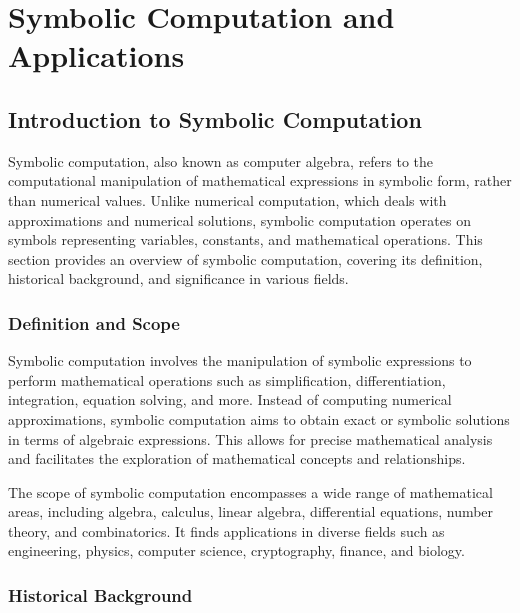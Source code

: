 
\chapter{Symbolic Computation and Applications}
\label{chap2:symbolic_computation}


\section{Introduction to Symbolic Computation}
\label{chap2:sec:introduction}

Symbolic computation, also known as computer algebra, refers to the computational manipulation of mathematical expressions in symbolic form, rather than numerical values. Unlike numerical computation, which deals with approximations and numerical solutions, symbolic computation operates on symbols representing variables, constants, and mathematical operations. This section provides an overview of symbolic computation, covering its definition, historical background, and significance in various fields.

\subsection{Definition and Scope}

Symbolic computation involves the manipulation of symbolic expressions to perform mathematical operations such as simplification, differentiation, integration, equation solving, and more. Instead of computing numerical approximations, symbolic computation aims to obtain exact or symbolic solutions in terms of algebraic expressions. This allows for precise mathematical analysis and facilitates the exploration of mathematical concepts and relationships.

The scope of symbolic computation encompasses a wide range of mathematical areas, including algebra, calculus, linear algebra, differential equations, number theory, and combinatorics. It finds applications in diverse fields such as engineering, physics, computer science, cryptography, finance, and biology.

\subsection{Historical Background}

